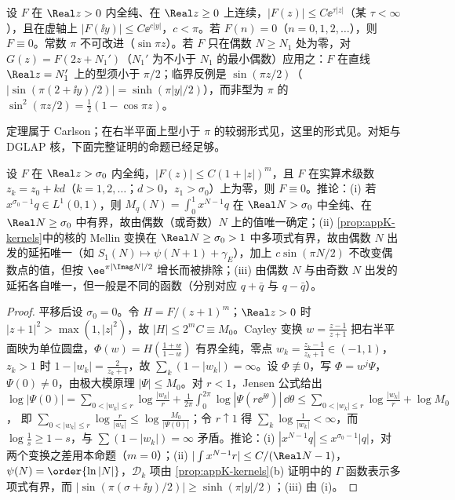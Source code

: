\begin{theorem}[Carlson 定理]\label{thm:appK-carlson}
设 $F$ 在 $\Real z>0$ 内全纯、在 $\Real z\ge0$ 上连续，$|F(z)|\le C\ee^{\tau|z|}$（某 $\tau<\infty$），且在虚轴上 $|F(\ii y)|\le C\ee^{c|y|}$，$c<\pi$。若 $F(n)=0$（$n=0,1,2,\dots$），则 $F\equiv0$。常数 $\pi$ 不可改进（$\sin\pi z$）。若 $F$ 只在偶数 $N\ge N_1$ 处为零，对 $G(z)=F(2z+N_1')$（$N_1'$ 为不小于 $N_1$ 的最小偶数）应用之：$F$ 在直线 $\Real z=N_1'$ 上的型须小于 $\pi/2$；临界反例是 $\sin(\pi z/2)$（$|\sin(\pi(2+\ii y)/2)|=\sinh(\pi|y|/2)$），而非型为 $\pi$ 的 $\sin^2(\pi z/2)=\frac12(1-\cos\pi z)$。
\end{theorem}

定理属于 Carlson\cite{Carlson1914}；在右半平面上型小于 $\pi$ 的较弱形式见\cite[第~5.81~节]{Titchmarsh1939}，这里的形式见\cite[定理~9.2.1]{Boas1954}。对矩与 DGLAP 核，下面完整证明的命题已经足够。

\begin{proposition}[多项式有界条件下延拓的唯一性]\label{prop:appK-continuation}
设 $F$ 在 $\Real z>\sigma_0$ 内全纯，$|F(z)|\le C(1+|z|)^m$，且 $F$ 在实算术级数 $z_k=z_0+kd$（$k=1,2,\dots$；$d>0$，$z_1>\sigma_0$）上为零，则 $F\equiv0$。推论：(i) 若 $x^{\sigma_0-1}q\in L^1(0,1)$，则 $M_q(N)=\int_0^1x^{N-1}q$ 在 $\Real N>\sigma_0$ 中全纯、在 $\Real N\ge\sigma_0$ 中有界，故由偶数（或奇数）$N$ 上的值唯一确定；(ii) \cref{prop:appK-kernels}中的核的 Mellin 变换在 $\Real N\ge\sigma_0>1$ 中多项式有界，故由偶数 $N$ 出发的延拓唯一（如 $S_1(N)\mapsto\psi(N+1)+\gamma_E$），加上 $c\sin(\pi N/2)$ 不改变偶数点的值，但按 $\ee^{\pi|\Imag N|/2}$ 增长而被排除；(iii) 由偶数 $N$ 与由奇数 $N$ 出发的延拓各自唯一，但一般是不同的函数（分别对应 $q+\bar q$ 与 $q-\bar q$）。
\end{proposition}

\begin{proof}
平移后设 $\sigma_0=0$。令 $H=F/(z+1)^m$；$\Real z>0$ 时 $|z+1|^2>\max(1,|z|^2)$，故 $|H|\le2^mC\equiv M_0$。Cayley 变换 $w=\frac{z-1}{z+1}$ 把右半平面映为单位圆盘，$\Phi(w)=H(\frac{1+w}{1-w})$ 有界全纯，零点 $w_k=\frac{z_k-1}{z_k+1}\in(-1,1)$，$z_k>1$ 时 $1-|w_k|=\frac{2}{z_k+1}$，故 $\sum_k(1-|w_k|)=\infty$。设 $\Phi\not\equiv0$，写 $\Phi=w^j\Psi$，$\Psi(0)\ne0$，由极大模原理 $|\Psi|\le M_0$。对 $r<1$，Jensen 公式\cite[第~15.16--15.20~节]{Rudin1987}给出
$\log|\Psi(0)|=\sum_{0<|w_k|\le r}\log\frac{|w_k|}{r}+\frac1{2\pi}\int_0^{2\pi}\log|\Psi(r\ee^{\ii\theta})|\,\dd\theta\le\sum_{0<|w_k|\le r}\log\frac{|w_k|}{r}+\log M_0$，
即 $\sum_{0<|w_k|\le r}\log\frac{r}{|w_k|}\le\log\frac{M_0}{|\Psi(0)|}$；令 $r\uparrow1$ 得 $\sum_k\log\frac1{|w_k|}<\infty$，而 $\log\frac1s\ge1-s$，与 $\sum(1-|w_k|)=\infty$ 矛盾。推论：(i) $|x^{N-1}q|\le x^{\sigma_0-1}|q|$，对两个变换之差用本命题（$m=0$）；(ii) $|\int x^{N-1}r|\le C/(\Real N-1)$，$\psi(N)=\order{\ln|N|}$，$\mathcal D_k$ 项由 \cref{prop:appK-kernels}(b) 证明中的 $\Gamma$ 函数表示多项式有界，而 $|\sin(\pi(\sigma+\ii y)/2)|\ge\sinh(\pi|y|/2)$；(iii) 由 (i)。
\end{proof}


